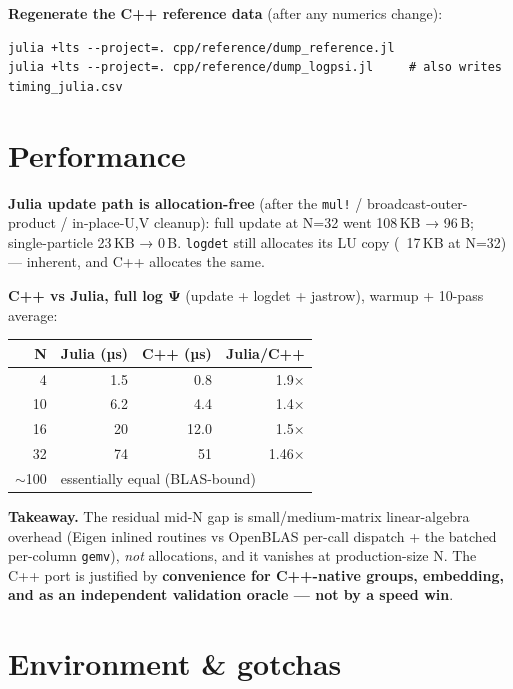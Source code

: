 \documentclass[11pt]{article}
\newcommand{\code}[1]{\texttt{#1}}
\begin{document}
\textbf{Regenerate the C++ reference data} (after any numerics change):
\begin{Verbatim}[fontsize=\small]
julia +lts --project=. cpp/reference/dump_reference.jl
julia +lts --project=. cpp/reference/dump_logpsi.jl     # also writes timing_julia.csv
\end{Verbatim}

\section{Performance}\label{sec:perf}

\textbf{Julia update path is allocation-free} (after the \code{mul!} / broadcast-outer-product /
in-place-U,V cleanup): full update at N=32 went 108\,KB → 96\,B; single-particle 23\,KB → 0\,B.
\code{logdet} still allocates its LU copy (~17\,KB at N=32) --- inherent, and C++ allocates the same.

\textbf{C++ vs Julia, full log Ψ} (update + logdet + jastrow), warmup + 10-pass average:
\begin{center}\small
\begin{tabular}{@{}r r r r@{}}
\toprule
N & Julia (µs) & C++ (µs) & Julia/C++ \\
\midrule
4   & 1.5  & 0.8  & 1.9× \\
10  & 6.2  & 4.4  & 1.4× \\
16  & ~20  & 12.0 & ~1.5× \\
32  & 74   & 51   & 1.46× \\
$\sim$100 & \multicolumn{3}{l}{essentially equal (BLAS-bound)} \\
\bottomrule
\end{tabular}
\end{center}

\textbf{Takeaway.} The residual mid-N gap is small/medium-matrix linear-algebra overhead
(Eigen inlined routines vs OpenBLAS per-call dispatch + the batched per-column \code{gemv}),
\emph{not} allocations, and it vanishes at production-size N. The C++ port is justified by
\textbf{convenience for C++-native groups, embedding, and as an independent validation
oracle --- not by a speed win}.

\section{Environment \& gotchas}
\end{document}
